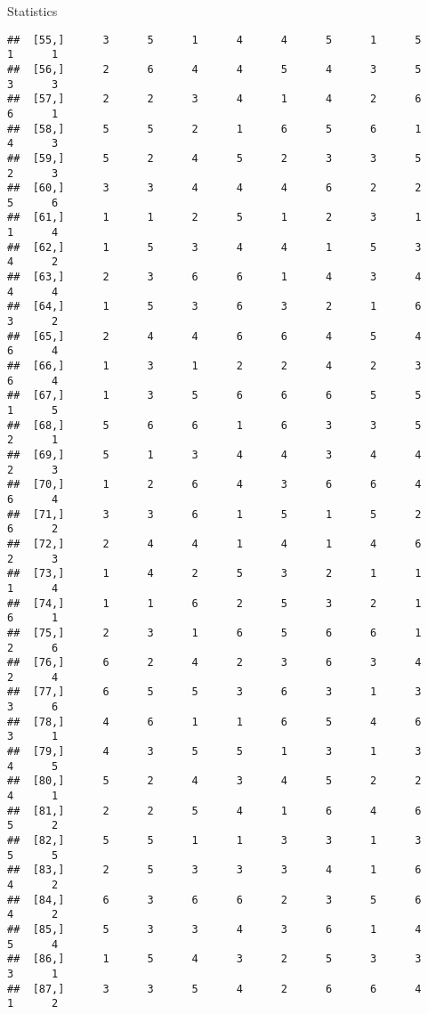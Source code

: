 \documentclass[
  ignorenonframetext,
]{beamer}
\begin{document}
\begin{frame}[fragile]{Statistics}
\begin{verbatim}
##  [55,]      3      5      1      4      4      5      1      5      1      1
##  [56,]      2      6      4      4      5      4      3      5      3      3
##  [57,]      2      2      3      4      1      4      2      6      6      1
##  [58,]      5      5      2      1      6      5      6      1      4      3
##  [59,]      5      2      4      5      2      3      3      5      2      3
##  [60,]      3      3      4      4      4      6      2      2      5      6
##  [61,]      1      1      2      5      1      2      3      1      1      4
##  [62,]      1      5      3      4      4      1      5      3      4      2
##  [63,]      2      3      6      6      1      4      3      4      4      4
##  [64,]      1      5      3      6      3      2      1      6      3      2
##  [65,]      2      4      4      6      6      4      5      4      6      4
##  [66,]      1      3      1      2      2      4      2      3      6      4
##  [67,]      1      3      5      6      6      6      5      5      1      5
##  [68,]      5      6      6      1      6      3      3      5      2      1
##  [69,]      5      1      3      4      4      3      4      4      2      3
##  [70,]      1      2      6      4      3      6      6      4      6      4
##  [71,]      3      3      6      1      5      1      5      2      6      2
##  [72,]      2      4      4      1      4      1      4      6      2      3
##  [73,]      1      4      2      5      3      2      1      1      1      4
##  [74,]      1      1      6      2      5      3      2      1      6      1
##  [75,]      2      3      1      6      5      6      6      1      2      6
##  [76,]      6      2      4      2      3      6      3      4      2      4
##  [77,]      6      5      5      3      6      3      1      3      3      6
##  [78,]      4      6      1      1      6      5      4      6      3      1
##  [79,]      4      3      5      5      1      3      1      3      4      5
##  [80,]      5      2      4      3      4      5      2      2      4      1
##  [81,]      2      2      5      4      1      6      4      6      5      2
##  [82,]      5      5      1      1      3      3      1      3      5      5
##  [83,]      2      5      3      3      3      4      1      6      4      2
##  [84,]      6      3      6      6      2      3      5      6      4      2
##  [85,]      5      3      3      4      3      6      1      4      5      4
##  [86,]      1      5      4      3      2      5      3      3      3      1
##  [87,]      3      3      5      4      2      6      6      4      1      2

\end{verbatim}
\end{frame}
\end{document}
